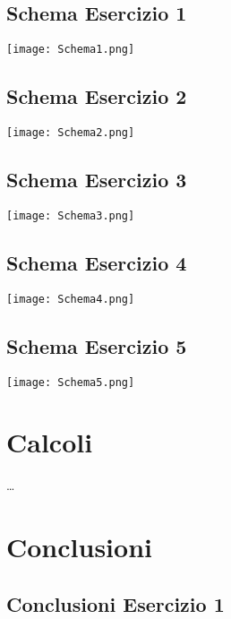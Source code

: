 \documentclass[a4paper]{article}
\begin{document}
\subsection{Schema Esercizio 1}
\begin{center}
\texttt{[image: Schema1.png]}
\end{center}

\subsection{Schema Esercizio 2}
\begin{center}
\texttt{[image: Schema2.png]}
\end{center}

\subsection{Schema Esercizio 3}
\begin{center}
\texttt{[image: Schema3.png]}
\end{center}

\subsection{Schema Esercizio 4}
\begin{center}
\texttt{[image: Schema4.png]}
\end{center}

\subsection{Schema Esercizio 5}
\begin{center}
\texttt{[image: Schema5.png]}
\end{center}

\section{Calcoli}
\dots




\section{Conclusioni}
\subsection{Conclusioni Esercizio 1}
\end{document}

